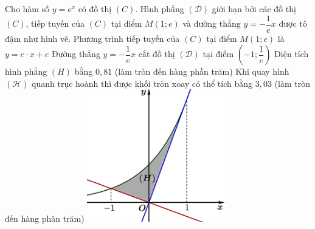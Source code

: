 \begin{ex}%
\immini
{
    Cho hàm số $y=\mathrm{e}^x$ có đồ thị $(C)$. Hình phẳng $(\mathscr{D})$ giới hạn bởi các đồ thị $(C)$, tiếp tuyến của $(C)$ tại điểm $ M\left(1;e\right)$ và đường thẳng $ y=-\dfrac{1}{e}x$ được tô đậm như hình vẽ.
    \choiceTF
    {Phương trình tiếp tuyến của $(C)$ tại điểm $ M\left(1;e\right)$ là $y=e\cdot x+e$}
    {\True Đường thẳng $ y=-\dfrac{1}{e}x$ cắt đồ thị $(\mathscr{D})$ tại điểm $\left(-1;\dfrac{1}{e}\right)$}
    {\True Diện tích hình phẳng $(H)$ bằng $0{,}81$ (làm tròn đến hàng phần trăm)}
    {Khi quay hình $(\mathscr{H})$ quanh trục hoành thì được khối tròn xoay có thể tích bằng $3{,}03$ (làm tròn đến hàng phân trăm)}
}
{
   \includegraphics[width=6cm]{img/HXN-1-14}
}
    
\end{ex}

